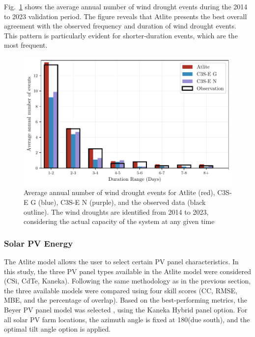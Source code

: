 \documentclass[preprint, 12pt]{elsarticle}
\begin{document}
Fig.~\ref{fig:bar_number_events_verification_wind} shows the average annual number of wind drought events during the 2014 to 2023 validation period. The figure reveals that Atlite presents the best overall agreement with the observed frequency and duration of wind drought events. This pattern is particularly evident for shorter-duration events, which are the most frequent.

\begin{figure}[!ht]
	\centering
	\includegraphics[width=\textwidth]{verification_wind_number_events.pdf}
	\caption{Average annual number of wind drought events for Atlite (red), C3S-E G (blue), C3S-E N (purple), and the observed data (black outline). The wind droughts are identified from 2014 to 2023, considering the actual capacity of the system at any given time}
	\label{fig:bar_number_events_verification_wind}
\end{figure}

\subsubsection{Solar PV Energy}
\label{sec:pv_verification}

The Atlite model allows the user to select certain PV panel characteristics. In this study, the three PV panel types available in the Atlite model were considered (CSi, CdTe, Kaneka). Following the same methodology as in the previous section, the three available models were compared using four skill scores (CC, RMSE, MBE, and the percentage of overlap). Based on the best-performing metrics, the Beyer PV panel model was selected \citep{beyer2004pv}, using the Kaneka Hybrid panel option. For all solar PV farm locations, the azimuth angle is fixed at 180\textdegree (due south), and the optimal tilt angle option is applied. 
\end{document}

